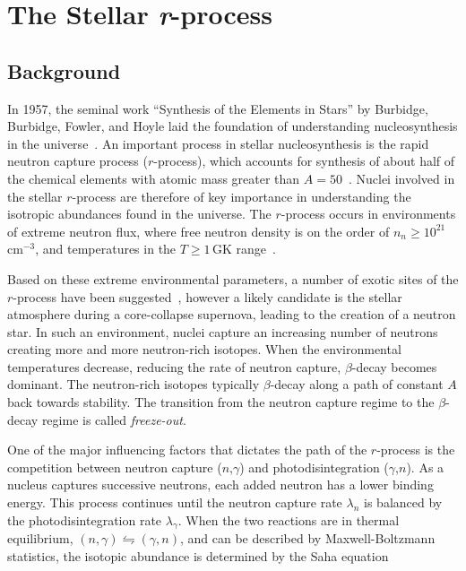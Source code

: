 \section{The Stellar \textit{r}-process}
\label{astro}
\subsection{Background}
In 1957, the seminal work ``Synthesis of the Elements in Stars'' by Burbidge, Burbidge, Fowler, and Hoyle laid the foundation of understanding nucleosynthesis in the universe~\cite{Burbidge_1957}.  An important process in stellar nucleosynthesis is the rapid neutron capture process ($r$-process), which accounts for synthesis of about half of the chemical elements with atomic mass greater than $A=50$~\cite{Martinez-Pinedo_1999}.  
Nuclei involved in the stellar $r$-process are therefore of key importance in understanding the isotropic abundances found in the universe.  The $r$-process occurs in environments of extreme neutron flux, where free neutron density is on the order of $n_n\geq10^{21}$\,cm$^{-3}$, and temperatures in the $T\geq1$\,GK range~\cite{Iliadis_2007}.  

Based on these extreme environmental parameters, a number of exotic sites of the $r$-\-pro\-cess have been suggested~\cite{Surman_2009}, however a likely candidate is the stellar atmosphere during a core-collapse supernova, leading to the creation of a neutron star.  In such an environment, nuclei capture an increasing number of neutrons creating more and more neutron-rich isotopes.  When the environmental temperatures decrease, reducing the rate of neutron capture, $\beta$-decay becomes dominant.  The neutron-rich isotopes typically $\beta$-decay along a path of constant $A$ back towards stability. The transition from the neutron capture  regime to the $\beta$-decay regime is called \textit{freeze-out}.

One of the major influencing factors that dictates the path of the $r$-process is the competition between neutron capture ($n$,$\gamma$) and photodisintegration ($\gamma$,$n$).  As a nucleus captures successive neutrons, each added neutron has a lower binding energy.  This process continues until the neutron capture rate $\lambda_n$ is balanced by the photodisintegration rate $\lambda_\gamma$.  When the two reactions are in thermal equilibrium, $(n,\gamma)\leftrightharpoons(\gamma,n)$, and can be described by Maxwell-Boltzmann statistics, the isotopic abundance is determined by the Saha equation%

